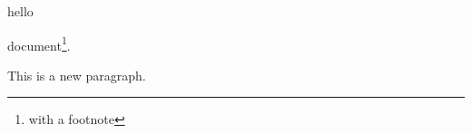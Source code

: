 \documentclass[a4paper,12pt]{article} %
\begin{document}
hello

document\footnote{with a footnote}.

This is a new paragraph.
\end{document}
